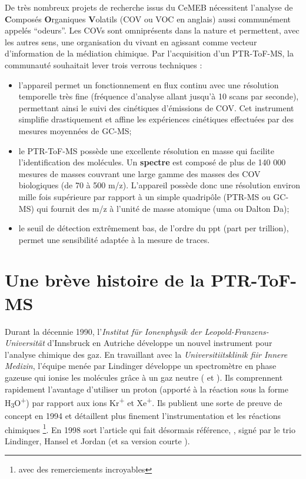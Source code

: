 \documentclass[
  12pt,
  american,
  a4paper,
  extrafontsizes,onecolumn,openright
  ]{memoir}
\providecommand{\tightlist}{%
  \setlength{\itemsep}{0pt}\setlength{\parskip}{0pt}}
\begin{document}
De très nombreux projets de recherche issus du CeMEB nécessitent l'analyse de \textbf{C}omposés \textbf{O}rganiques \textbf{V}olatils (COV ou VOC en anglais) aussi communément appelés ``odeurs''. Les COVs sont omniprésents dans la nature et permettent, avec les autres sens, une organisation du vivant en agissant comme vecteur d'information de la médiation chimique. Par l'acquisition d'un PTR-ToF-MS, la communauté souhaitait lever trois verrous techniques :

\begin{itemize}
\tightlist
\item
  l'appareil permet un fonctionnement en flux continu avec une résolution temporelle très fine (fréquence d'analyse allant jusqu'à 10 scans par seconde), permettant ainsi le suivi des cinétiques d'émissions de COV. Cet instrument simplifie drastiquement et affine les expériences cinétiques effectuées par des mesures moyennées de GC-MS;\\
\item
  le PTR-ToF-MS possède une excellente résolution en masse qui facilite l'identification des molécules. Un \textbf{spectre} est composé de plus de 140 000 mesures de masses couvrant une large gamme des masses des COV biologiques (de 70 à 500 m/z). L'appareil possède donc une résolution environ mille fois supérieure par rapport à un simple quadripôle (PTR-MS ou GC-MS) qui fournit des m/z à l'unité de masse atomique (uma ou Dalton Da);\\
\item
  le seuil de détection extrêmement bas, de l'ordre du ppt (part per trillion), permet une sensibilité adaptée à la mesure de traces.
\end{itemize}

\hypertarget{une-bruxe8ve-histoire-de-la-ptr-tof-ms}{%
\section{Une brève histoire de la PTR-ToF-MS}\label{une-bruxe8ve-histoire-de-la-ptr-tof-ms}}

Durant la décennie 1990, l'\emph{Institut für Ionenphysik der Leopold-Franzens-Universität} d'Innsbruck en Autriche développe un nouvel instrument pour l'analyse chimique des gaz. En travaillant avec la \emph{Universitiitsklinik fiir Innere Medizin}, l'équipe menée par Lindinger développe un spectromètre en phase gazeuse qui ionise les molécules grâce à un gaz neutre (\autocite{lindinger_1991} et \autocite{lindinger_1993}). Ils comprennent rapidement l'avantage d'utiliser un proton (apporté à la réaction sous la forme H\textsubscript{3}O\textsuperscript{+}) par rapport aux ions Kr\textsuperscript{+} et Xe\textsuperscript{+}. Ils publient une sorte de preuve de concept en 1994 \autocite{lagg_1994} et détaillent plus finement l'instrumentation et les réactions chimiques \autocite{hansel_1995}\footnote{avec des remerciements incroyables}. En 1998 sort l'article qui fait désormais référence, \autocite{lindinger_1998a}, signé par le trio Lindinger, Hansel et Jordan (et sa version courte \textcite{lindinger_1998}).
\end{document}
